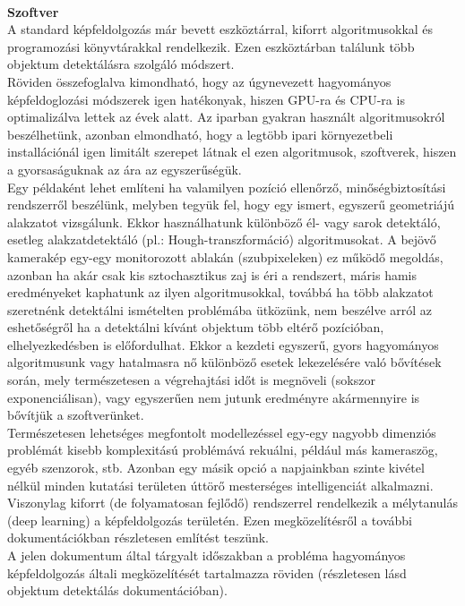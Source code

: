 \documentclass{article}
\begin{document}
\vspace{15pt}\\
\hspace{-15pt}\textbf{Szoftver}\\[15pt]
A standard képfeldolgozás már bevett eszköztárral, kiforrt algoritmusokkal és 
programozási könyvtárakkal rendelkezik. Ezen eszköztárban találunk több objektum detektálásra
szolgáló módszert.\\ Röviden összefoglalva kimondható, hogy az úgynevezett hagyományos 
képfeldoglozási módszerek igen hatékonyak, hiszen GPU-ra és CPU-ra is optimalizálva lettek
az évek alatt. Az iparban gyakran használt algoritmusokról beszélhetünk, azonban elmondható, hogy
a legtöbb ipari környezetbeli installációnál igen limitált szerepet látnak el ezen algoritmusok,
szoftverek, hiszen a gyorsaságuknak az ára az egyszerűségük.\\Egy példaként lehet említeni ha
valamilyen pozíció ellenőrző, minőségbiztosítási rendszerről beszélünk, melyben tegyük fel, 
hogy egy ismert, egyszerű geometriájú alakzatot vizsgálunk. Ekkor használhatunk különböző
él- vagy sarok detektáló, esetleg alakzatdetektáló (pl.: Hough-transzformáció) algoritmusokat.
A bejövő kamerakép egy-egy monitorozott ablakán (szubpixeleken) ez működő megoldás, azonban ha akár csak kis
sztochasztikus zaj is éri a rendszert, máris hamis eredményeket kaphatunk az ilyen
 algoritmusokkal, továbbá ha több alakzatot szeretnénk detektálni ismételten problémába ütközünk,
 nem beszélve arról az eshetőségről ha a detektálni kívánt objektum több eltérő pozícióban,
 elhelyezkedésben is előfordulhat. Ekkor a kezdeti egyszerű, gyors hagyományos algoritmusunk 
 vagy hatalmasra nő különböző esetek lekezelésére való bővítések során, mely természetesen
 a végrehajtási időt is megnöveli (sokszor exponenciálisan), vagy egyszerűen nem jutunk eredményre
 akármennyire is bővítjük a szoftverünket.\\
 Természetesen lehetséges megfontolt modellezéssel egy-egy nagyobb dimenziós problémát
 kisebb komplexitású problémává rekuálni, például más kameraszög, egyéb szenzorok, stb.
 Azonban egy másik opció a napjainkban szinte kivétel nélkül minden kutatási területen
 úttörő mesterséges intelligenciát alkalmazni. Viszonylag kiforrt (de folyamatosan fejlődő) rendszerrel rendelkezik
 a mélytanulás (deep learning) a képfeldolgozás területén. Ezen megközelítésről a további 
 dokumentációkban részletesen említést teszünk.\vspace{5pt}\\
 A jelen dokumentum által tárgyalt időszakban a probléma hagyományos képfeldolgozás általi
 megközelítését tartalmazza röviden (részletesen lásd objektum detektálás dokumentációban).
\end{document}
